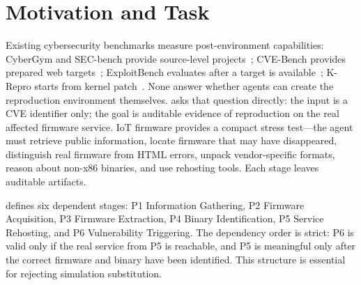 \section{Motivation and Task}
Existing cybersecurity benchmarks measure post-environment capabilities: CyberGym and SEC-bench provide source-level projects~\cite{cybergym,secbench}; CVE-Bench provides prepared web targets~\cite{cvebench}; ExploitBench evaluates after a target is available~\cite{exploitbench}; K-Repro starts from kernel patch~\cite{krepro}. None answer whether agents can create the reproduction environment themselves. \sys{} asks that question directly: the input is a CVE identifier only; the goal is auditable evidence of reproduction on the real affected firmware service. IoT firmware provides a compact stress test---the agent must retrieve public information, locate firmware that may have disappeared, distinguish real firmware from HTML errors, unpack vendor-specific formats, reason about non-x86 binaries, and use rehosting tools. Each stage leaves auditable artifacts.

\sys{} defines six dependent stages: P1 Information Gathering, P2 Firmware Acquisition, P3 Firmware Extraction, P4 Binary Identification, P5 Service Rehosting, and P6 Vulnerability Triggering. The dependency order is strict: P6 is valid only if the real service from P5 is reachable, and P5 is meaningful only after the correct firmware and binary have been identified. This structure is essential for rejecting simulation substitution.
